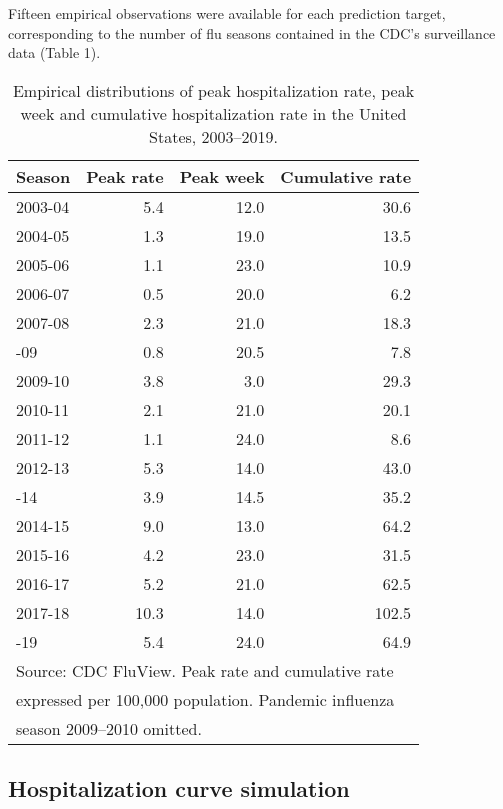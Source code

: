 \documentclass[10pt,letterpaper]{article}
\begin{document}
Fifteen empirical observations were available for each prediction
target, corresponding to the number of flu seasons contained in the
CDC's surveillance data (Table 1).

\begin{table}

\caption{\label{tab:target-table}Empirical distributions of peak hospitalization rate, peak week and cumulative hospitalization rate in the United States, 2003--2019.}
\centering
\begin{tabular}[t]{lrrr}
\toprule
Season & Peak rate & Peak week & Cumulative rate\\
\midrule
2003-04 & 5.4 & 12.0 & 30.6\\
2004-05 & 1.3 & 19.0 & 13.5\\
2005-06 & 1.1 & 23.0 & 10.9\\
2006-07 & 0.5 & 20.0 & 6.2\\
2007-08 & 2.3 & 21.0 & 18.3\\
\addlinespace
2008-09 & 0.8 & 20.5 & 7.8\\
2009-10 & 3.8 & 3.0 & 29.3\\
2010-11 & 2.1 & 21.0 & 20.1\\
2011-12 & 1.1 & 24.0 & 8.6\\
2012-13 & 5.3 & 14.0 & 43.0\\
\addlinespace
2013-14 & 3.9 & 14.5 & 35.2\\
2014-15 & 9.0 & 13.0 & 64.2\\
2015-16 & 4.2 & 23.0 & 31.5\\
2016-17 & 5.2 & 21.0 & 62.5\\
2017-18 & 10.3 & 14.0 & 102.5\\
\addlinespace
2018-19 & 5.4 & 24.0 & 64.9\\
\bottomrule
\multicolumn{4}{l}{Source: CDC FluView. Peak rate and cumulative rate}\\
\multicolumn{4}{l}{expressed per 100,000 population. Pandemic influenza}\\
\multicolumn{4}{l}{season 2009--2010 omitted.}\\
\end{tabular}
\end{table}

\hypertarget{hospitalization-curve-simulation}{%
\subsection{Hospitalization curve
simulation}\label{hospitalization-curve-simulation}}
\end{document}
